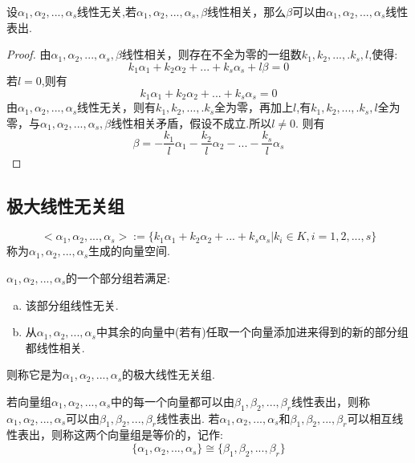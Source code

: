 \documentclass[blue,normal,cn]{elegantnote}
\begin{document}
\begin{theorem}
\begin{proposition}
    设$α_1,α_2,...,α_s$线性无关,若$α_1,α_2,...,α_s,β$线性相关，那么$β$可以由$α_1,α_2,...,α_s$线性表出.
\end{proposition}
\begin{proof}
    由$α_1,α_2,...,α_s,β$线性相关，则存在不全为零的一组数$k_1,k_2,...,.k_s,l$,使得:
    \begin{equation*}
        k_1 α_1+k_2 α_2+...+k_s α_s+l β =0 
    \end{equation*}
    若$l=0$,则有
    \begin{equation*}
        k_1 α_1+k_2 α_2+...+k_s α_s=0 
    \end{equation*}
    由$α_1,α_2,...,α_s$线性无关，则有$k_1,k_2,...,.k_s$全为零，再加上$l$,有$k_1,k_2,...,.k_s,l$全为零，与$α_1,α_2,...,α_s,β$线性相关矛盾，假设不成立.所以$l\neq 0$.
    则有
    \begin{equation*}
         β =-\frac{k_1}{l} α_1-\frac{k_2}{l} α_2-...-\frac{k_s}{l} α_s 
    \end{equation*}
\end{proof}


\subsection{极大线性无关组}
\begin{definition}
    \begin{equation*}
        <α_1,α_2,...,α_s>:=\{k_1 α_1+k_2 α_2+...+k_s α_s|k_i∈ K,i=1,2,...,s\}
    \end{equation*}
称为$α_1,α_2,...,α_s$生成的向量空间.
\end{definition}


\begin{definition}
    $α_1,α_2,...,α_s$的一个部分组若满足:
    \begin{enumerate}[(a)]
        \item 该部分组线性无关.
        \item 从$α_1,α_2,...,α_s$中其余的向量中(若有)任取一个向量添加进来得到的新的部分组都线性相关.
    \end{enumerate}
    则称它是为$α_1,α_2,...,α_s$的极大线性无关组.
\end{definition}

\begin{definition}
    若向量组$α_1,α_2,...,α_s$中的每一个向量都可以由$β_1,β_2,...,β_r$线性表出，则称$α_1,α_2,...,α_s$可以由$β_1,β_2,...,β_r$线性表出.
    若$α_1,α_2,...,α_s$和$β_1,β_2,...,β_r$可以相互线性表出，则称这两个向量组是等价的，记作:
    \begin{equation*}
        \{α_1,α_2,...,α_s\} \cong \{β_1,β_2,...,β_r\}
    \end{equation*}
\end{definition}


\end{theorem}
\end{document}
